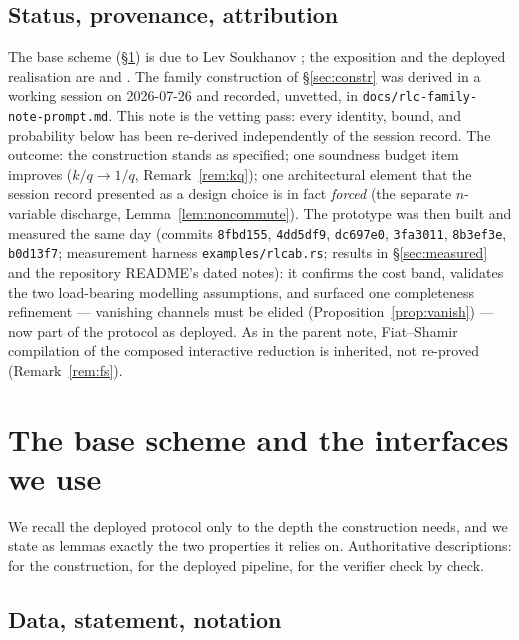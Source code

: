 \documentclass[11pt]{article}
\DeclareRobustCommand{\code}[1]{{\def\_{\textunderscore\allowbreak}\texttt{#1}}}
\theoremstyle{plain}
\theoremstyle{definition}
\theoremstyle{remark}
\begin{document}
\subsection{Status, provenance, attribution}\label{sec:status}

The base scheme (\S\ref{sec:base}) is due to Lev Soukhanov \cite{Sou}; the
exposition and the deployed realisation are \cite{Xnote} and
\cite{F2Zdesign}. The family construction of \S\ref{sec:constr} was derived in
a working session on 2026-07-26 and recorded, unvetted, in
\code{docs/rlc-family-note-prompt.md}. This note is the vetting pass: every
identity, bound, and probability below has been re-derived independently of
the session record. The outcome: the construction stands as specified; one
soundness budget item improves ($k/q\to 1/q$, Remark~\ref{rem:kq}); one
architectural element that the session record presented as a design choice is
in fact \emph{forced} (the separate $n$-variable discharge,
Lemma~\ref{lem:noncommute}). The prototype was then built and measured the
same day (commits \texttt{8fbd155}, \texttt{4dd5df9}, \texttt{dc697e0},
\texttt{3fa3011}, \texttt{8b3ef3e}, \texttt{b0d13f7}; measurement harness
\code{examples/rlc\_ab.rs}; results in \S\ref{sec:measured} and the
repository README's dated notes): it confirms the cost band, validates the
two load-bearing modelling assumptions, and surfaced one completeness
refinement --- vanishing channels must be elided
(Proposition~\ref{prop:vanish}) --- now part of the protocol as deployed.
As in the parent note, Fiat--Shamir compilation of the composed interactive
reduction is inherited, not re-proved (Remark~\ref{rem:fs}).

\section{The base scheme and the interfaces we use}\label{sec:base}

We recall the deployed protocol only to the depth the construction needs, and
we state as lemmas exactly the two properties it relies on. Authoritative
descriptions: \cite[\S9]{Xnote} for the construction,
\cite{F2Zdesign} for the deployed pipeline, \cite{F2Zverifier} for the
verifier check by check.

\subsection{Data, statement, notation}\label{sec:notation}
\end{document}

